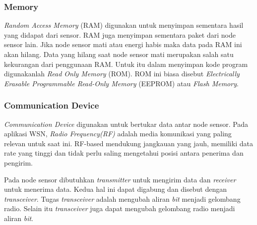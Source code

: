 \subsubsection{Memory}
\textit{Random Access Memory} (RAM) digunakan untuk menyimpan sementara hasil yang didapat dari sensor. RAM juga menyimpan sementara paket dari node sensor lain. Jika node sensor mati atau energi habis maka data pada RAM ini akan hilang. Data yang hilang saat node sensor mati merupakan salah satu kekurangan dari penggunaan RAM. Untuk itu dalam menyimpan kode program digunakanlah \textit{Read Only Memory} (ROM). ROM ini biasa disebut \textit{Electrically Erasable Programmable Read-Only Memory} (EEPROM) atau \textit{Flash Memory}.

\subsubsection{Communication Device}
\textit{Communication Device} digunakan untuk bertukar data antar node sensor. Pada aplikasi WSN, \textit{Radio Frequency(RF)} adalah media komunikasi yang paling relevan untuk saat ini. RF-based mendukung jangkauan yang jauh, memiliki data rate yang tinggi dan tidak perlu saling mengetahui posisi antara penerima dan pengirim.

Pada node sensor dibutuhkan \textit{transmitter} untuk mengirim data dan \textit{receiver} untuk menerima data. Kedua hal ini dapat digabung dan disebut dengan \textit{transceiver}. Tugas \textit{transceiver} adalah mengubah aliran \textit{bit} menjadi gelombang radio. Selain itu \textit{transceiver} juga dapat mengubah gelombang radio menjadi aliran \textit{bit}.

